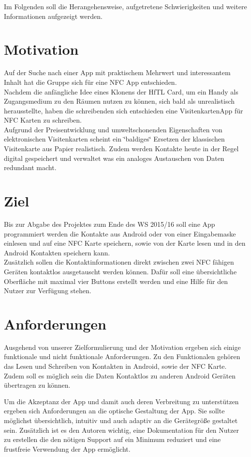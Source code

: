 \documentclass[a4paper,ngerman,12pt]{report}
\begin{document}
Im Folgenden soll die Herangehensweise, aufgetretene Schwierigkeiten und weitere Informationen aufgezeigt werden.

\section{Motivation}

Auf der Suche nach einer App mit praktischem Mehrwert und interessantem Inhalt hat die Gruppe sich für eine NFC App entschieden. \\
Nachdem die anfängliche Idee eines Klonens der HfTL Card, um ein Handy als Zugangsmedium zu den Räumen nutzen zu können, sich bald als unrealistisch herausstellte, haben die schreibenden sich entschieden eine VisitenkartenApp für NFC Karten zu schreiben. \\
Aufgrund der Preisentwicklung und umweltschonenden Eigenschaften von elektronischen Visitenkarten scheint ein \char`\"{}baldiges\char`\"{} Ersetzen der klassischen Visitenkarte aus Papier realistisch. Zudem werden Kontakte heute in der Regel digital gespeichert und verwaltet was ein analoges Austauschen von Daten redundant macht.

\section{Ziel}
Bis zur Abgabe des Projektes zum Ende des WS 2015/16 soll eine App programmiert werden die Kontakte aus Android oder von einer Eingabemaske einlesen und auf eine NFC Karte speichern, sowie von der Karte lesen und in den Android Kontakten speichern kann. \\
Zusätzlich sollen die Kontaktinformationen direkt zwischen zwei NFC fähigen Geräten kontaktlos ausgetauscht werden können. Dafür soll eine übersichtliche Oberfläche mit maximal vier Buttons erstellt werden und eine Hilfe für den Nutzer zur Verfügung stehen.

\section{Anforderungen}
Ausgehend von unserer Zielformulierung und der Motivation ergeben sich einige funktionale und nicht funktionale Anforderungen.
Zu den Funktionalen gehören das Lesen und Schreiben von Kontakten in Android, sowie der NFC Karte.
Zudem soll es möglich sein die Daten Kontaktlos zu anderen Android Geräten übertragen zu können.\newline

Um die Akzeptanz der App und damit auch deren Verbreitung zu unterstützen ergeben sich Anforderungen an die optische Gestaltung der App. Sie sollte möglichst übersichtlich, intuitiv und auch adaptiv an die Gerätegröße gestaltet sein. Zusätzlich ist es den Autoren wichtig, eine Dokumentation für den Nutzer zu erstellen die den nötigen Support auf ein Minimum reduziert und eine frustfreie Verwendung der App ermöglicht.
\end{document}
